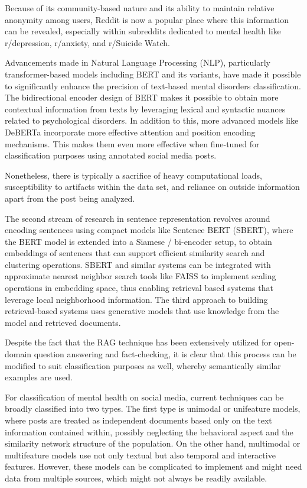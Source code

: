 \documentclass[11pt]{article}
\begin{document}
Because of its community-based nature and its ability to maintain relative anonymity among users, Reddit is now a popular place where this information can be revealed, especially within subreddits dedicated to mental health like r/depression, r/anxiety, and r/Suicide Watch.

Advancements made in Natural Language Processing (NLP), particularly transformer-based models including BERT and its variants, have made it possible to significantly enhance the precision of text-based mental disorders classification. The bidirectional encoder design of BERT makes it possible to obtain more contextual information from texts by leveraging lexical and syntactic nuances related to psychological disorders. In addition to this, more advanced models like DeBERTa incorporate more effective attention and position encoding mechanisms. This makes them even more effective when fine-tuned for classification purposes using annotated social media posts.

Nonetheless, there is typically a sacrifice of heavy computational loads, susceptibility to artifacts within the data set, and reliance on outside information apart from the post being analyzed.

The second stream of research in sentence representation revolves around encoding sentences using compact models like Sentence BERT (SBERT), where the BERT model is extended into a Siamese / bi-encoder setup, to obtain embeddings of sentences that can support efficient similarity search and clustering operations. SBERT and similar systems can be integrated with approximate nearest neighbor search tools like FAISS to implement scaling operations in embedding space, thus enabling retrieval based systems that leverage local neighborhood information. The third approach to building retrieval-based systems uses generative models that use knowledge from the model and retrieved documents.

Despite the fact that the RAG technique has been extensively utilized for open-domain question answering and fact-checking, it is clear that this process can be modified to suit classification purposes as well, whereby semantically similar examples are used.

For classification of mental health on social media, current techniques can be broadly classified into two types. The first type is unimodal or unifeature models, where posts are treated as independent documents based only on the text information contained within, possibly neglecting the behavioral aspect and the similarity network structure of the population. On the other hand, multimodal or multifeature models use not only textual but also temporal and interactive features. However, these models can be complicated to implement and might need data from multiple sources, which might not always be readily available.
\end{document}
